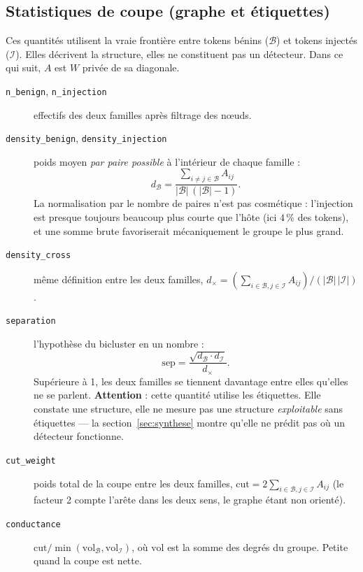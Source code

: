 \documentclass[11pt,a4paper]{article}
\begin{document}
\subsection{Statistiques de coupe (graphe et étiquettes)}

Ces quantités utilisent la vraie frontière entre tokens bénins ($\mathcal{B}$)
et tokens injectés ($\mathcal{I}$). Elles décrivent la structure, elles ne
constituent pas un détecteur. Dans ce qui suit, $A$ est $W$ privée de sa
diagonale.

\begin{description}
\item[\texttt{n\_benign}, \texttt{n\_injection}] effectifs des deux familles
  après filtrage des n\oe uds.

\item[\texttt{density\_benign}, \texttt{density\_injection}] poids moyen
  \emph{par paire possible} à l'intérieur de chaque famille :
  \[
    d_{\mathcal{B}}
      = \frac{\sum_{i \ne j \in \mathcal{B}} A_{ij}}
             {|\mathcal{B}|\,(|\mathcal{B}|-1)}.
  \]
  La normalisation par le nombre de paires n'est pas cosmétique :
  l'injection est presque toujours beaucoup plus courte que l'hôte
  (ici $4\,\%$ des tokens), et une somme brute favoriserait mécaniquement le
  groupe le plus grand.

\item[\texttt{density\_cross}] même définition entre les deux familles,
  $d_{\times} = \left(\sum_{i \in \mathcal{B}, j \in \mathcal{I}} A_{ij}\right)
  / (|\mathcal{B}|\,|\mathcal{I}|)$.

\item[\texttt{separation}] l'hypothèse du bicluster en un nombre :
  \[
    \mathrm{sep} = \frac{\sqrt{d_{\mathcal{B}} \cdot d_{\mathcal{I}}}}{d_\times}.
  \]
  Supérieure à 1, les deux familles se tiennent davantage entre elles qu'elles
  ne se parlent. \textbf{Attention} : cette quantité utilise les étiquettes.
  Elle constate une structure, elle ne mesure pas une structure
  \emph{exploitable} sans étiquettes --- la section~\ref{sec:synthese} montre
  qu'elle ne prédit pas où un détecteur fonctionne.

\item[\texttt{cut\_weight}] poids total de la coupe entre les deux familles,
  $\mathrm{cut} = 2\sum_{i \in \mathcal{B}, j \in \mathcal{I}} A_{ij}$
  (le facteur 2 compte l'arête dans les deux sens, le graphe étant non
  orienté).

\item[\texttt{conductance}] $\mathrm{cut} / \min(\mathrm{vol}_{\mathcal{B}},
  \mathrm{vol}_{\mathcal{I}})$, où $\mathrm{vol}$ est la somme des degrés du
  groupe. Petite quand la coupe est nette.


\end{description}
\end{document}

